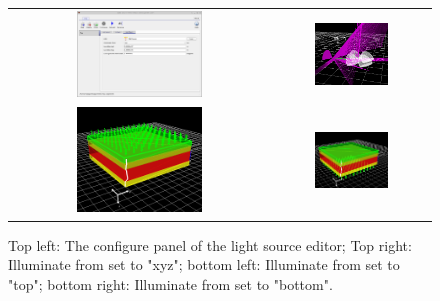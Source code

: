 \begin{figure}[H]
\centering
\begin{tabular}{ c c }

\includegraphics[width=0.5\textwidth,height=0.4\textwidth]{./images/lights2.png}

&
\includegraphics[width=0.5\textwidth,height=0.4\textwidth]{./images/light_xyz.png}
\\

\includegraphics[width=0.5\textwidth,height=0.4\textwidth]{./images/light_top.png}

&
\includegraphics[width=0.5\textwidth,height=0.4\textwidth]{./images/light_btm.png}
\\
\end{tabular}
\caption{Top left: The configure panel of the light source editor; Top right: Illuminate from set to "xyz"; bottom left: Illuminate from set to "top"; bottom right: Illuminate from set to "bottom".}
\label{fig:lightsourceeditor}
\label{fig:transfermatrix1}
\end{figure}



